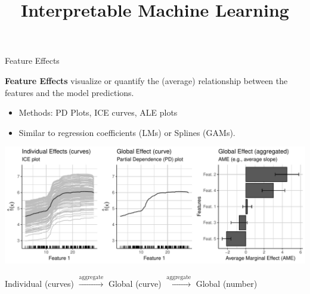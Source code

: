 \documentclass[11pt,compress,t,notes=noshow, xcolor=table]{beamer}
\title{Interpretable Machine Learning}
\institute{\href{https://compstat-lmu.github.io/lecture_iml/}{compstat-lmu.github.io/lecture\_iml}}
\date{}
\begin{document}





\begin{vbframe}{Feature Effects}

\textbf{Feature Effects} visualize or quantify the (average) relationship between the features and the model predictions. %
\begin{itemize}
\item Methods: PD Plots, ICE curves, ALE plots
\item Similar to regression coefficients (LMs) or Splines (GAMs).
\end{itemize}

\centerline{\includegraphics[width=\textwidth]{figure_man/feature-effects.pdf}}

\hspace{8px} \small Individual (curves) \hspace{2px}
$\xrightarrow[]{\text{aggregate}}$ \hspace{2px} Global (curve) \hspace{2px}
$\xrightarrow[]{\text{aggregate}}$ \hspace{2px} Global (number)

\end{vbframe}
\end{document}
